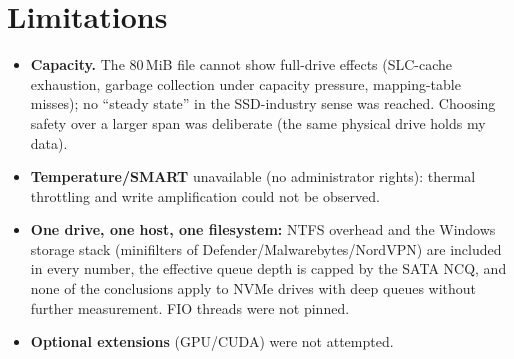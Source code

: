 ﻿\documentclass[10.5pt]{article}
\begin{document}
\section{Limitations}
\begin{itemize}
  \item \textbf{Capacity.} The 80\,MiB file cannot show full-drive effects (SLC-cache exhaustion, garbage collection under capacity pressure, mapping-table misses); no ``steady state'' in the SSD-industry sense was reached. Choosing safety over a larger span was deliberate (the same physical drive holds my data).
  \item \textbf{Temperature/SMART} unavailable (no administrator rights): thermal throttling and write amplification could not be observed.
  \item \textbf{One drive, one host, one filesystem:} NTFS overhead and the Windows storage stack (minifilters of Defender/Malwarebytes/NordVPN) are included in every number, the effective queue depth is capped by the SATA NCQ, and none of the conclusions apply to NVMe drives with deep queues without further measurement. FIO threads were not pinned.
  \item \textbf{Optional extensions} (GPU/CUDA) were not attempted.
\end{itemize}
\end{document}
